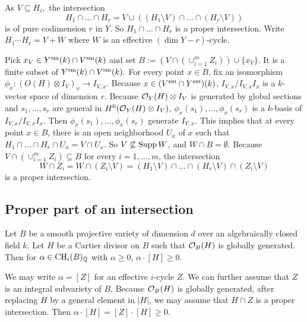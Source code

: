 As $V\subseteq H_i,$ the intersection
$$H_1\cap \dots \cap H_r= V\cup ((H_1\setminus V)\cap\dots\cap  (H_r\setminus V))
$$
 is of pure codimension $r$ in $Y$.
So $H_1\cap \dots \cap H_r$ is a proper intersection.
Write $H_{1}\cdots H_{r}=V+W$ where $W$ is an effective $(\dim Y-r)$-cycle.







Pick $x_V\in Y^{{\rm sm}}(k)\cap V^{{\rm sm}}(k)$ and set $B:=(V\cap (\cup_{i=1}^m Z_i))\cup \{x_V\}$. It is a finite subset of $Y^{{\rm sm}}(k)\cap V^{{\rm sm}}(k).$
For every point $x\in B$, fix an isomorphism $\phi_x: (O(H)\otimes I_V)_x\to I_{V,x}.$  Because $x\in (V^{{\rm sm}}\cap Y^{{\rm sm}})(k)$, $I_{V,x}/ I_{V,x}I_x$ is a $k$-vector space of dimension $r.$ Because ${\mathcal O}_Y(H)\otimes I_V$ is generated by global sections and $s_1, \dots, s_r$ are general in $H^0({\mathcal O}_Y(H)\otimes I_V)$, $\phi_x(s_1), \dots, \phi_x(s_r)$ is a $k$-basis of
$I_{V,x}/ I_{V,x}I_x$. Then $\phi_x(s_1),\dots, \phi_x(s_r)$ generate $I_{V,x}.$ This implies that at every point $x\in B$, there is an open neighborhood $U_x$ of $x$ such that $H_1\cap \dots \cap H_r\cap U_x=V\cap U_x.$
So $V\not\subseteq {\rm Supp} \,W$, and $W\cap B=\emptyset.$
Because $V\cap (\cup_{i=1}^m Z_i)\subseteq B$ for every $i=1,\dots, m$,
the intersection
$$W\cap Z_i=W\cap (Z_i\setminus V)=(H_1\setminus V)\cap\dots\cap  (H_r\setminus V)\cap (Z_i\setminus V)$$ is a proper intersection.
\endproof




\subsection{Proper part of an intersection}


\begin{lem}
\notready\label{lemcutampleeff}
Let $B$ be a smooth projective variety of dimension $d$ over an algebraically closed field $k$.
Let $H$ be a Cartier divisor on $B$ such that ${\mathcal O}_B(H)$ is globally generated.
Then for $\alpha\in {\rm CH}_i(B)_{{\mathbb Q}}$ with $\alpha\geq 0$, $\alpha\cdot [H] \geq 0.$
\end{lem}

\proof
We may write $\alpha=[Z]$ for an effective $i$-cycle $Z$. We can further assume that $Z$ is an integral subvariety of $B$.
Because ${\mathcal O}_B(H)$ is globally generated, after replacing $H$ by a general element in $|H|$, we may assume that $H\cap Z$ is a proper intersection.
Then $\alpha\cdot [H]=[Z]\cdot [H]\geq 0.$
\endproof






